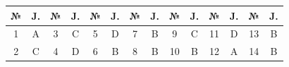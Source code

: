 






\begin{table}[!ht]
\centering
\begin{tabular}{|c|c|c|c|c|c|c|c|c|c|c|c|c|c|}
\hline
№ & J. & № & J. & № & J. & № & J. & № & J.& № & J. & № & J. \\ \hline
1 & A & 3 & C & 5 & D & 7 & B & 9 & C & 11 & D & 13 & B\\ \hline
2 & C & 4 & D & 6 & B & 8 & B & 10 & B & 12 & A & 14 & B\\ \hline
\end{tabular}
\end{table}
